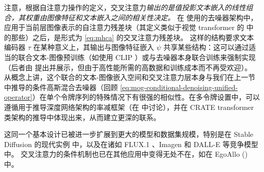 \documentclass[../../book-main_zh.tex]{subfiles}
\begin{document}
注意，根据自注意力操作的定义，交叉注意力\textit{输出的是值投影文本嵌入的线性组合，其权重由图像特征和文本嵌入之间的相关性决定。}
在 \textcite{rombach2022high} 使用的去噪器架构中，应用于当前层图像表示的自注意力残差块（其定义类似于视觉 transformer 的  中的那些）之后，是形式为 \eqref{eq:mhca} 的交叉注意力残差块。
这样的结构要求文本编码器 $\tau$ 在某种意义上，其输出与图像特征嵌入 $\psi$ 共享某些结构：这可以通过适当的联合文本-图像预训练（如使用 CLIP \cite{Radford2021-ir}）或与去噪器本身联合训练来强制实现（后者由 \textcite{rombach2022high} 提出并展示，但由于高性能所需的高数据和训练成本而不再受欢迎）。
从概念上讲，这个联合的文本-图像嵌入空间和交叉注意力层本身与我们在上一节中推导的条件高斯混合去噪器（回顾 \eqref{eq:mog-conditional-denoising-unified-operator}）在单个令牌序列的特殊情况下有很强的相似性。在多令牌设置中，可以遵循用于推导深度网络架构的率减框架（在  中讨论），并在 CRATE transformer 类架构的推导中体现出来，从而建立更深的联系。

这同一个基本设计已被进一步扩展到更大的模型和数据集规模，特别是在 Stable Diffusion 的现代实例 \cite{DBLP:conf/icml/EsserKBEMSLLSBP24} 中，以及在诸如 FLUX.1 \cite{Labs2025-fb}、Imagen \cite{Saharia2022-na} 和 DALL-E \cite{Ramesh2022-nu} 等竞争模型中。
交叉注意力的条件机制也已在其他应用中变得无处不在，如在 EgoAllo () 中。


%
\end{document}
